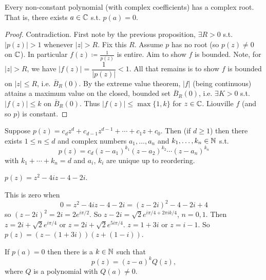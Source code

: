 \documentclass[10pt, a4paper]{article}
\begin{document}
\begin{theorem}
    Every non-constant polynomial
    (with complex coefficients)
    has a complex root.
    That is,
    there exists $a \in \mathbb{C}$ s.t. $p(a) = 0$.

    \begin{proof}
        Contradiction.
        First note by the previous proposition,
        $\exists R > 0$ s.t. $|p(z)| > 1$ whenever $|z| > R$.
        Fix this $R$.
        Assume $p$ has no root
        (so $p(z) \neq 0$ on $\mathbb{C}$).
        In particular $f(z) \coloneqq \frac{1}{p(z)}$ is entire.
        Aim to show $f$ is bounded.
        Note,
        for $|z| > R$,
        we have $|f(z)| = \dfrac{1}{|p(z)|} < 1$.
        All that remains is to show $f$ is bounded on $|z| \leq R$,
        i.e. $\overline{B}_{R}(0)$.
        By the extreme value theorem,
        $|f|$
        (being continuous)
        attains a maximum value on the closed,
        bounded set $\overline{B}_{R}(0)$,
        i.e. $\exists K > 0$ s.t. $|f(z)| \leq k$ on $\overline{B}_{R}(0)$.
        Thus $|f(z)| \leq \max\{1, k\}$ for $z \in \mathbb{C}$.
        Liouville $f$
        (and so $p$)
        is constant.
    \end{proof}
\end{theorem}

\begin{corollary}
    Suppose $p(z) = c_dz ^ d + c_{d - 1}z ^ {d - 1} + \dotsi + c_1z + c_0$.
    Then
    (if $d \geq 1$)
    then there exists $1 \leq n \leq d$ and complex numbers $a_1, \dotsc, a_n$ and $k_1, \dotsc, k_n \in \mathbb{N}$ s.t.
    \[
    p(z) = c_d(z - a_1) ^ {k_1}(z - a_2) ^ {k_2} \dotsi (z - a_n) ^ {k_n}
    \]
    with $k_1 + \dotsi + k_n = d$ and $a_i$,
    $k_i$ are unique up to reordering.
\end{corollary}

\begin{example}
    $p(z) = z ^ 2 - 4iz - 4 - 2i$.

    This is zero when
    \[
    0 = z ^ 2 - 4iz - 4 - 2i = (z - 2i) ^ 2 - 4 - 2i + 4 
    \]
    so $(z - 2i) ^ 2 = 2i = 2e ^ {i\pi / 2}$.
    So $z - 2i = \sqrt{2}e ^ {i\pi / 4 + 2\pi ik / 4}$,
    $n = 0, 1$.
    Then $z = 2i + \sqrt{2}e ^ {i\pi / 4}$ or $z = 2i + \sqrt{2}e ^ {5i\pi / 4}$.
    $z = 1 + 3i$ or $z = i - 1$.
    So $p(z) = (z - (1 + 3i))(z + (1 - i))$.
\end{example}

If $p(a) = 0$ then there is a $k \in \mathbb{N}$ such that
\[
p(z) = (z - a) ^ kQ(z),
\]
where $Q$ is a polynomial with $Q(a) \neq 0$.
\end{document}
